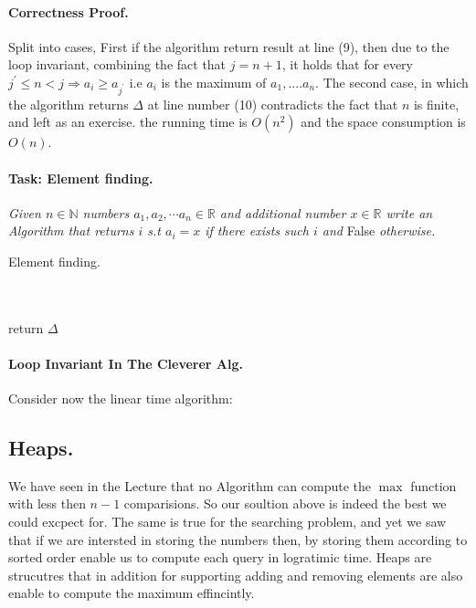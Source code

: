 \paragraph{Correctness Proof.} Split into cases, First if the algorithm return result at line (9), then due to the loop invariant, combining the fact that \( j = n + 1\), it holds that for every \(j^\prime  \le n < j \Rightarrow a_i \ge a_{j^\prime} \)  i.e \(a_i\) is the maximum of \(a_1, .... a_n \). The second case, in which the algorithm returns \( \Delta \) at line number (10) contradicts the fact that \(n\) is finite, and left as an exercise.  the running time is \( O(n^2) \) and the space consumption is \(O(n)\). 

\paragraph{Task: Element finding.}  \textit{Given $n\in \mathbb{N}$ numbers $a_1, a_2, \cdots a_n \in \mathbb{R}$ and additional number $x \in \mathbb{R}$ write an Algorithm that returns $i$ s.t $a_{i} = x$ if there exists such $i$ and} False \textit{otherwise.} 

\begin{algbox}{Element finding.}
\begin{algorithm}[H]
{}
 \ \\ 
  { 
        \ \\ 
    } 
    return \( \Delta \) 
\end{algorithm}
\end{algbox}

\paragraph{Loop Invariant In The Cleverer Alg.} Consider now the linear time algorithm:

\subsection*{Heaps.} We have seen in the Lecture that no Algorithm can compute the $\max$ function with less then $n-1$ comparisions. So our soultion above is indeed the best we could excpect for. The same is true for the searching problem, and yet we saw that if we are intersted in storing the numbers then, by storing them according to sorted order enable us to compute each query in logratimic time. Heaps are strucutres that in addition for supporting adding and removing elements are also enable to compute the maximum effincintly.  




